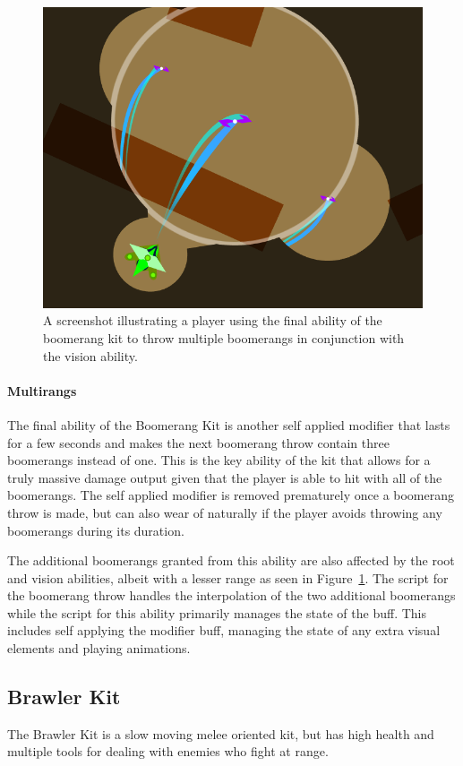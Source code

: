 \begin{figure}[tbph]  %
  \centering
  \includegraphics[width=.75\textwidth]{images/boomerangKitMultirang}
  \caption[Screenshot of the multi-boomerang ability]{A screenshot illustrating a player using the final ability of the boomerang kit to throw multiple boomerangs in conjunction with the vision ability.}
  \label{fig:boomerangMultirang}
\end{figure}

\paragraph{Multirangs}
The final ability of the Boomerang Kit is another self applied modifier that lasts for a few seconds and makes the next boomerang throw contain three boomerangs instead of one. This is the key ability of the kit that allows for a truly massive damage output given that the player is able to hit with all of the boomerangs. The self applied modifier is removed prematurely once a boomerang throw is made, but can also wear of naturally if the player avoids throwing any boomerangs during its duration. 

The additional boomerangs granted from this ability are also affected by the root and vision abilities, albeit with a lesser range as seen in Figure~\ref{fig:boomerangMultirang}. The script for the boomerang throw handles the interpolation of the two additional boomerangs while the script for this ability primarily manages the state of the buff. This includes self applying the modifier buff, managing the state of any extra visual elements and playing animations. 


\subsection{Brawler Kit}
The Brawler Kit is a slow moving melee oriented kit, but has high health and multiple tools for dealing with enemies who fight at range. 

